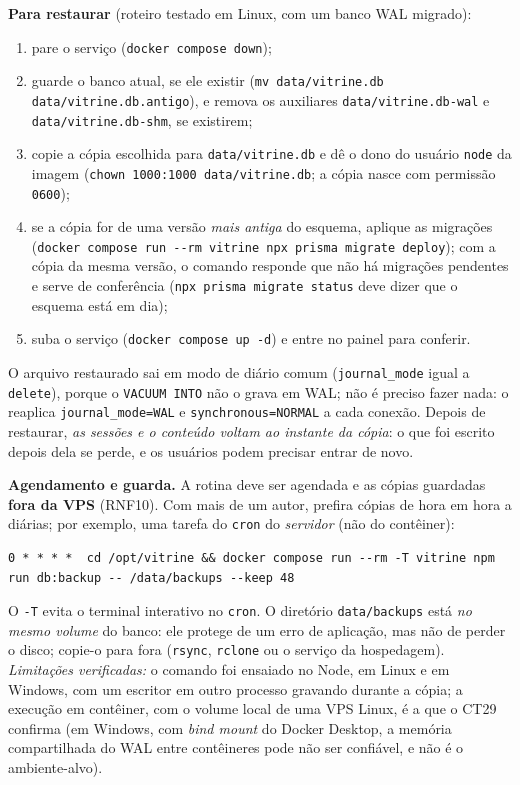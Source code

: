 \textbf{Para restaurar} (roteiro testado em Linux, com um banco WAL migrado):
\begin{enumerate}
  \item pare o serviço (\texttt{docker compose down});
  \item guarde o banco atual, se ele existir (\texttt{mv data/vitrine.db data/vitrine.db.antigo}), e remova os auxiliares \texttt{data/vitrine.db-wal} e \texttt{data/vitrine.db-shm}, se existirem;
  \item copie a cópia escolhida para \texttt{data/vitrine.db} e dê o dono do usuário \texttt{node} da imagem (\texttt{chown 1000:1000 data/vitrine.db}; a cópia nasce com permissão \texttt{0600});
  \item se a cópia for de uma versão \emph{mais antiga} do esquema, aplique as migrações (\texttt{docker compose run -{}-rm vitrine npx prisma migrate deploy}); com a cópia da mesma versão, o comando responde que não há migrações pendentes e serve de conferência (\texttt{npx prisma migrate status} deve dizer que o esquema está em dia);
  \item suba o serviço (\texttt{docker compose up -d}) e entre no painel para conferir.
\end{enumerate}
O arquivo restaurado sai em modo de diário comum (\texttt{journal\_mode} igual a \texttt{delete}), porque o \texttt{VACUUM INTO} não o grava em WAL; não é preciso fazer nada: o  reaplica \texttt{journal\_mode=WAL} e \texttt{synchronous=NORMAL} a cada conexão. Depois de restaurar, \emph{as sessões e o conteúdo voltam ao instante da cópia}: o que foi escrito depois dela se perde, e os usuários podem precisar entrar de novo.

\textbf{Agendamento e guarda.} A rotina deve ser agendada e as cópias guardadas \textbf{fora da VPS} (RNF10). Com mais de um autor, prefira cópias de hora em hora a diárias; por exemplo, uma tarefa do \texttt{cron} do \emph{servidor} (não do contêiner):

\begin{lstlisting}[language=VSh, caption={Esboço: cópia de hora em hora, com as 48 últimas}, label={lst:backup-cron}]
0 * * * *  cd /opt/vitrine && docker compose run --rm -T vitrine npm run db:backup -- /data/backups --keep 48
\end{lstlisting}

O \texttt{-T} evita o terminal interativo no \texttt{cron}. O diretório \texttt{data/backups} está \emph{no mesmo volume} do banco: ele protege de um erro de aplicação, mas não de perder o disco; copie-o para fora (\texttt{rsync}, \texttt{rclone} ou o serviço da hospedagem). \emph{Limitações verificadas:} o comando foi ensaiado no Node, em Linux e em Windows, com um escritor em outro processo gravando durante a cópia; a execução em contêiner, com o volume local de uma VPS Linux, é a que o CT29 confirma (em Windows, com \emph{bind mount} do Docker Desktop, a memória compartilhada do WAL entre contêineres pode não ser confiável, e não é o ambiente-alvo).

